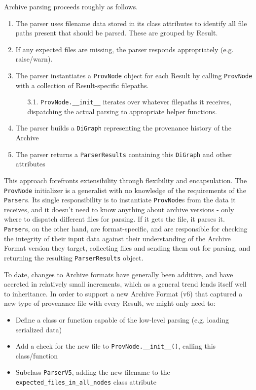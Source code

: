 Archive parsing proceeds roughly as follows.
\begin{enumerate}
    \item The parser uses filename data stored in its class attributes to
        identify all file paths present that should be parsed. These are grouped by
        Result.
    \item If any expected files are missing, the parser responds appropriately (e.g. raise/warn).
    \item The parser instantiates a \texttt{ProvNode} object for each Result by
        calling \texttt{ProvNode} with a collection of Result-specific filepaths.
    \begin{enumerate}
        \item[3.1.]\texttt{ProvNode.\_\_init\_\_} iterates over whatever
            filepaths it receives, dispatching the actual parsing to appropriate
            helper functions. 
    \end{enumerate}
    \item The parser builds a \texttt{DiGraph} representing the provenance
        history of the Archive
    \item The parser returns a \texttt{ParserResults} containing this
        \texttt{DiGraph} and other attributes
\end{enumerate}

This approach forefronts extensibility through flexibility and encapsulation.
The \texttt{ProvNode} initializer is a generalist with no knowledge of the requirements
of the \texttt{Parser}s. Its single responsibility is to instantiate \texttt{ProvNode}s from the
data it receives, and it doesn’t need to know anything about archive versions -
only where to dispatch different files for parsing. If it gets the file, it
parses it. \texttt{Parser}s, on the other hand, are format-specific, and are responsible
for checking the integrity of their input data against their understanding of
the Archive Format version they target, collecting files and sending them out
for parsing, and returning the resulting \texttt{ParserResults} object.

To date, changes to Archive formats have generally been additive, and have
accreted in relatively small increments, which as a general trend lends itself
well to inheritance. In order to support a new Archive Format (v6) that captured
a new type of provenance file with every Result, we might only need to:
\begin{itemize}
    \item Define a class or function capable of the low-level parsing (e.g. loading serialized data)
    \item Add a check for the new file to \texttt{ProvNode.\_\_init\_\_()}, calling this class/function
    \item Subclass \texttt{ParserV5}, adding the new filename to the \texttt{expected\_files\_in\_all\_nodes} class attribute
\end{itemize}

